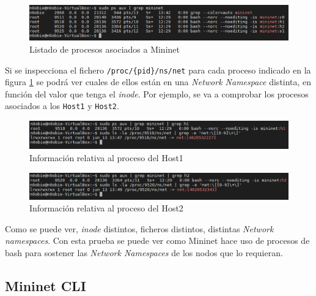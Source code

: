 \begin{figure}[ht]
    \centering
    \includegraphics[width=15.5cm]{archivos/img/teoria/mn_03.png}
    \caption{Listado de procesos asociados a Mininet}
    \label{fig:mininet_03}
\end{figure}

Si se inspecciona el fichero \texttt{/proc/\{pid\}/ns/net} para cada proceso indicado en la figura \ref{fig:mininet_03} se podrá ver cuales de ellos están en una \textit{Network Namespace} distinta, en función del valor que tenga el \textit{inode}. Por ejemplo, se va a comprobar los procesos asociados a los \texttt{Host1} y \texttt{Host2}.\\
\par

\begin{figure}[ht]
    \centering
    \includegraphics[width=15.5cm]{archivos/img/teoria/mn_04.png}
    \caption{Información relativa al proceso del Host1}
    \label{fig:mininet_04}
\end{figure}

\newpage

\begin{figure}[ht]
    \centering
    \includegraphics[width=15.5cm]{archivos/img/teoria/mn_05.png}
    \caption{Información relativa al proceso del Host2}
    \label{fig:mininet_05}
\end{figure}

Como se puede ver, \textit{inode} distintos, ficheros distintos, distintas \textit{Network namespaces}. Con esta prueba se puede ver como Mininet hace uso de procesos de bash para sostener las \textit{Network Namespaces} de los nodos que lo requieran. 

\subsection{Mininet CLI}

